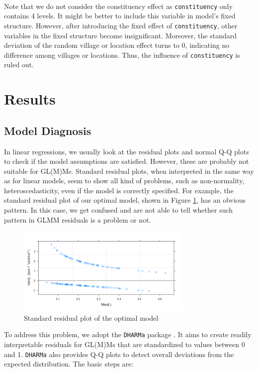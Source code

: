 \documentclass[11pt,twoside]{article}
\numberwithin{Theorem}{section}
\numberwithin{Definition}{section}
\numberwithin{Lemma}{section}
\numberwithin{Algorithm}{section}
\numberwithin{equation}{section}
\begin{document}
\

Note that we do not consider the constituency effect as \texttt{constituency} only contains 4 levels. It might be better to include this variable in model's fixed structure. However, after introducing the fixed effect of \texttt{constituency}, other variables in the fixed structure become insignificant. Moreover, the standard deviation of the random village or location effect turns to 0, indicating no difference among villages or locations. Thus, the influence of \texttt{constituency} is ruled out.

\clearpage

\section{Results}
\label{sec:results}

\subsection{Model Diagnosis} 

In linear regressions, we usually look at the residual plots and normal Q-Q plots to check if the model assumptions are satisfied. However, these are probably not suitable for GL(M)Ms. Standard residual plots, when interpreted in the same way as for linear models, seem to show all kind of problems, such as non-normality, heteroscedasticity, even if the model is correctly specified. For example, the standard residual plot of our optimal model, shown in Figure \ref{fig:std_resplot}, has an obvious pattern. In this case, we get confused and are not able to tell whether such pattern in GLMM residuals is a problem or not.

\begin{figure}[!h]
	\centering
	\includegraphics[width = 0.75\textwidth]{Images/std_resplot.png}
	\caption{Standard residual plot of the optimal model}
	\label{fig:std_resplot}
\end{figure}

To address this problem, we adopt the \texttt{DHARMa} package \cite{dharma}. It aims to create readily interpretable residuals for GL(M)Ms that are standardized to values between 0 and 1. \texttt{DHARMa} also provides Q-Q plots to detect overall deviations from the expected distribution. The basic steps are:
\end{document}
